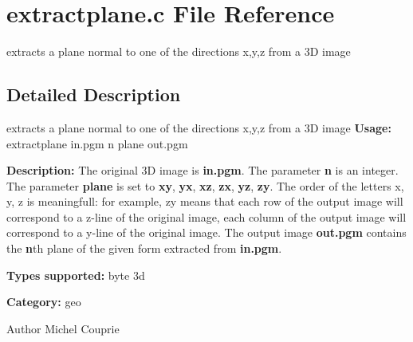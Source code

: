 \section{extractplane.c File Reference}
\label{extractplane_8c}


extracts a plane normal to one of the directions x,y,z from a 3D image  




\subsection{Detailed Description}
extracts a plane normal to one of the directions x,y,z from a 3D image {\bfseries Usage:} extractplane in.pgm n plane out.pgm

{\bfseries Description:} The original 3D image is {\bfseries in.pgm}. The parameter {\bfseries n} is an integer. The parameter {\bfseries plane} is set to {\bfseries xy}, {\bfseries yx}, {\bfseries xz}, {\bfseries zx}, {\bfseries yz}, {\bfseries zy}. The order of the letters x, y, z is meaningfull: for example, zy means that each row of the output image will correspond to a z-\/line of the original image, each column of the output image will correspond to a y-\/line of the original image. The output image {\bfseries out.pgm} contains the {\bfseries n}th plane of the given form extracted from {\bfseries in.pgm}.

{\bfseries Types supported:} byte 3d

{\bfseries Category:} geo

\begin{DoxyAuthor}{Author}
Michel Couprie 
\end{DoxyAuthor}
